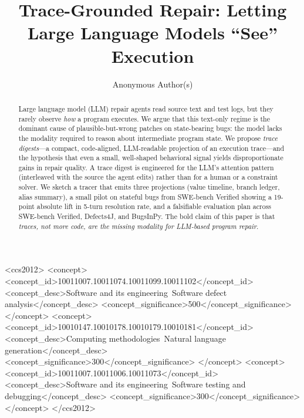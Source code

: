 \documentclass[sigconf,review,anonymous,nonacm]{acmart}
\begin{document}
\title{Trace-Grounded Repair: Letting Large Language Models ``See'' Execution}

\author{Anonymous Author(s)}

\renewcommand{\shortauthors}{Anonymous}

\begin{abstract}
Large language model (LLM) repair agents read source text and test logs, but
they rarely observe \emph{how} a program executes. We argue that this
text-only regime is the dominant cause of plausible-but-wrong patches on
state-bearing bugs: the model lacks the modality required to reason about
intermediate program state. We propose \emph{trace digests}---a compact,
code-aligned, LLM-readable projection of an execution trace---and the
hypothesis that even a small, well-shaped behavioral signal yields
disproportionate gains in repair quality. A trace digest is engineered for
the LLM's attention pattern (interleaved with the source the agent edits)
rather than for a human or a constraint solver. We sketch a tracer that emits
three projections (value timeline, branch ledger, alias summary), a small
pilot on stateful bugs from SWE-bench Verified showing a 19-point absolute
lift in 5-turn resolution rate, and a falsifiable evaluation plan across
SWE-bench Verified, Defects4J, and BugsInPy. The bold claim of this paper is
that \emph{traces, not more code, are the missing modality for LLM-based
program repair}.
\end{abstract}

\begin{CCSXML}
<ccs2012>
 <concept>
  <concept_id>10011007.10011074.10011099.10011102</concept_id>
  <concept_desc>Software and its engineering~Software defect analysis</concept_desc>
  <concept_significance>500</concept_significance>
 </concept>
 <concept>
  <concept_id>10010147.10010178.10010179.10010181</concept_id>
  <concept_desc>Computing methodologies~Natural language generation</concept_desc>
  <concept_significance>300</concept_significance>
 </concept>
 <concept>
  <concept_id>10011007.10011006.10011073</concept_id>
  <concept_desc>Software and its engineering~Software testing and debugging</concept_desc>
  <concept_significance>300</concept_significance>
 </concept>
</ccs2012>
\end{CCSXML}

\end{document}

